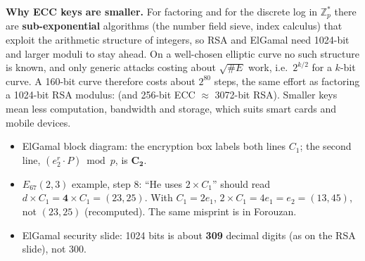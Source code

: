 \textbf{Why ECC keys are smaller.} For factoring and for the discrete log in $\mathbb{Z}_p^*$ there are \textbf{sub-exponential} algorithms (the number field sieve, index calculus) that exploit the arithmetic structure of integers, so RSA and ElGamal need 1024-bit and larger moduli to stay ahead. On a well-chosen elliptic curve no such structure is known, and only generic attacks costing about $\sqrt{\#E}$ work, i.e.\ $2^{k/2}$ for a $k$-bit curve. A 160-bit curve therefore costs about $2^{80}$ steps, the same effort as factoring a 1024-bit RSA modulus:  (and 256-bit ECC $\approx$ 3072-bit RSA). Smaller keys mean less computation, bandwidth and storage, which suits smart cards and mobile devices.


\begin{fixbox}
\begin{itemize}[leftmargin=1.2em,itemsep=0pt]
  \item ElGamal block diagram: the encryption box labels both lines $C_1$; the second line, $(e_2^r \cdot P) \bmod p$, is $\boldsymbol{C_2}$.
  \item $E_{67}(2, 3)$ example, step 8: ``He uses $2 \times C_1$'' should read $d \times C_1 = \boldsymbol{4} \times C_1 = (23, 25)$. With $C_1 = 2e_1$, $2 \times C_1 = 4e_1 = e_2 = (13, 45)$, not $(23, 25)$ (recomputed). The same misprint is in Forouzan.
  \item ElGamal security slide: 1024 bits is about \textbf{309} decimal digits (as on the RSA slide), not 300.
\end{itemize}
\end{fixbox}
